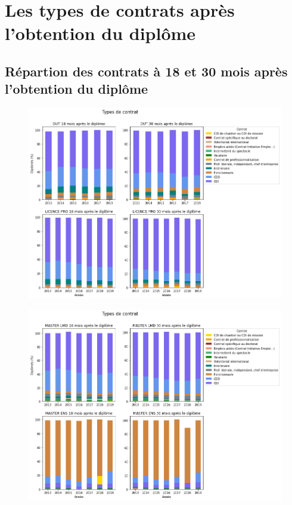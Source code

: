 \documentclass[12pt, a4paper, titlepage, table]{article}
\begin{document}
\section{Les types de contrats après l'obtention du diplôme}

	\subsection{Répartion des contrats à 18 et 30 mois après l'obtention du diplôme}
		\begin{figure}[H]
			\centering
			\includegraphics[width=1\textwidth]{../graphs/repartition_contrats_situation_1.png}
		\end{figure}
	
		\begin{figure}[H]
			\centering
			\includegraphics[width=1\textwidth]{../graphs/repartition_contrats_situation_2.png}
		\end{figure}
\end{document}
